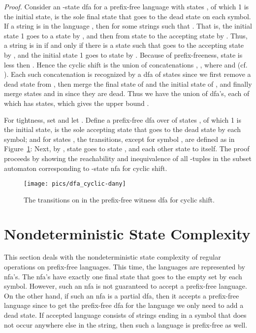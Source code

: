 \documentclass[copyright]{eptcs}
\begin{document}
 \noindent\emph{Proof.}
  Consider an -state dfa  for a prefix-free language 
  with states ,
  of which 1 is the initial state,
   is the sole final state that goes to the dead state  on each symbol.
  If a string  is in the language ,
  then  for some strings  such that .
  That is, the initial state 1 goes to a state  by ,
  and then from state  to the accepting state  by .
  Thus, a string  is in  if and only if
  there is a state  such that  goes to the accepting state  by ,
  and the initial state 1 goes to state  by .
  Because of prefix-freeness,
  state  is less then  .
  Hence the cyclic shift is the union of  concatenations
  , , where
   and
   (cf. \cite{jo08}).
  Each such concatenation is recognized by a dfa of  states
  since we first remove a dead state from ,
  then merge the final state of  and the initial state of ,
  and finally merge states  and  in 
  since they are dead.
  Thus we have the union of  dfa's,
  each of which has  states,
  which gives the upper bound .

  For tightness, set  and let
  .
  Define a prefix-free dfa  over  of  states ,
  of which 1 is the initial state,
   is the sole accepting state that goes to the dead state  
  by each symbol;
  and for states , the transitions, except for symbol , are defined
  as in Figure~\ref{fig:dfa_cyclic-dany}:
  Next,     by , state  goes to state ,
  and each other state to itself.
  The proof proceeds by showing the reachability 
  and inequivalence of all -tuples in the subset automaton 
  corresponding to  -state nfa for cyclic shift.
  \begin{figure}[t]
  \centerline{\texttt{[image: pics/dfa\_cyclic-dany]}}
  \caption{The transitions on  in the prefix-free 
           witness dfa for cyclic shift.}
  \label{fig:dfa_cyclic-dany}
  \end{figure}
 \hfill

 \section{Nondeterministic State Complexity}
 \label{***nondet}

 This section deals with the nondeterministic state complexity
 of regular operations on prefix-free languages.
 This time, the languages are represented by nfa's.
 The nfa's have exactly one final state that goes to the empty set by each symbol.
 However,  such an nfa is not guaranteed
 to accept a prefix-free language.
 On the other hand, if such an nfa is a partial dfa, 
 then it accepts a prefix-free language
 since to get the prefix-free dfa for the language 
 we only need to add a dead state.
 If accepted language consists of  strings ending in a symbol 
 that does not occur anywhere else in the string, 
 then such a language is prefix-free as well.
\end{document}
